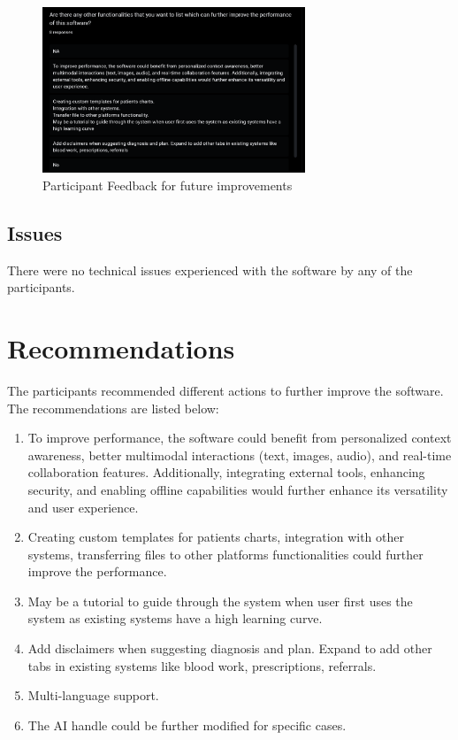 \documentclass{article}
\begin{document}
\begin{figure}[h]
    \centering
    \includegraphics[width=0.7\textwidth]{Improvements.png}
    \caption{Participant Feedback for future improvements}
    \label{FigUH}
\end{figure}

\subsection{Issues}

There were no technical issues experienced with the software by any of the participants.

\newpage

\section{Recommendations}

The participants recommended different actions to further improve the software. The recommendations are listed below:

\begin{enumerate}
    \item To improve performance, the software could benefit from personalized context awareness, better multimodal interactions (text, images, audio), and real-time collaboration features. Additionally, integrating external tools, enhancing security, and enabling offline capabilities would further enhance its versatility and user experience.
    \item Creating custom templates for patients charts, integration with other systems, transferring files to other platforms functionalities could further improve the performance.
    \item May be a tutorial to guide through the system when user first uses the system as existing systems have a high learning curve.
    \item Add disclaimers when suggesting diagnosis and plan. Expand to add other tabs in existing systems like blood work, prescriptions, referrals.
    \item Multi-language support.
    \item The AI handle could be further modified for specific cases.
\end{enumerate}
\end{document}
